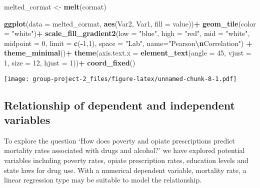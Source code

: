 \documentclass[
]{article}
\newenvironment{Shaded}{\begin{snugshade}}{\end{snugshade}}
\newcommand{\AttributeTok}[1]{\textcolor[rgb]{0.13,0.29,0.53}{#1}}
\newcommand{\DecValTok}[1]{\textcolor[rgb]{0.00,0.00,0.81}{#1}}
\newcommand{\FunctionTok}[1]{\textcolor[rgb]{0.13,0.29,0.53}{\textbf{#1}}}
\newcommand{\NormalTok}[1]{#1}
\newcommand{\OtherTok}[1]{\textcolor[rgb]{0.56,0.35,0.01}{#1}}
\newcommand{\SpecialCharTok}[1]{\textcolor[rgb]{0.81,0.36,0.00}{\textbf{#1}}}
\newcommand{\StringTok}[1]{\textcolor[rgb]{0.31,0.60,0.02}{#1}}
\begin{document}
\begin{Shaded}
\begin{Highlighting}[]
\NormalTok{melted\_cormat }\OtherTok{\textless{}{-}} \FunctionTok{melt}\NormalTok{(cormat)}

\FunctionTok{ggplot}\NormalTok{(}\AttributeTok{data =}\NormalTok{ melted\_cormat, }\FunctionTok{aes}\NormalTok{(Var2, Var1, }\AttributeTok{fill =}\NormalTok{ value))}\SpecialCharTok{+}
 \FunctionTok{geom\_tile}\NormalTok{(}\AttributeTok{color =} \StringTok{"white"}\NormalTok{)}\SpecialCharTok{+}
 \FunctionTok{scale\_fill\_gradient2}\NormalTok{(}\AttributeTok{low =} \StringTok{"blue"}\NormalTok{, }\AttributeTok{high =} \StringTok{"red"}\NormalTok{, }\AttributeTok{mid =} \StringTok{"white"}\NormalTok{, }
   \AttributeTok{midpoint =} \DecValTok{0}\NormalTok{, }\AttributeTok{limit =} \FunctionTok{c}\NormalTok{(}\SpecialCharTok{{-}}\DecValTok{1}\NormalTok{,}\DecValTok{1}\NormalTok{), }\AttributeTok{space =} \StringTok{"Lab"}\NormalTok{, }
   \AttributeTok{name=}\StringTok{"Pearson}\SpecialCharTok{\textbackslash{}n}\StringTok{Correlation"}\NormalTok{) }\SpecialCharTok{+}
  \FunctionTok{theme\_minimal}\NormalTok{()}\SpecialCharTok{+} 
 \FunctionTok{theme}\NormalTok{(}\AttributeTok{axis.text.x =} \FunctionTok{element\_text}\NormalTok{(}\AttributeTok{angle =} \DecValTok{45}\NormalTok{, }\AttributeTok{vjust =} \DecValTok{1}\NormalTok{, }
    \AttributeTok{size =} \DecValTok{12}\NormalTok{, }\AttributeTok{hjust =} \DecValTok{1}\NormalTok{))}\SpecialCharTok{+}
 \FunctionTok{coord\_fixed}\NormalTok{()}
\end{Highlighting}
\end{Shaded}

\texttt{[image: group-project-2\_files/figure-latex/unnamed-chunk-8-1.pdf]}

\hypertarget{relationship-of-dependent-and-independent-variables}{%
\subsection{Relationship of dependent and independent
variables}\label{relationship-of-dependent-and-independent-variables}}

To explore the question `How does poverty and opiate prescriptions
predict mortality rates associated with drugs and alcohol?' we have
explored potential variables including poverty rates, opiate
prescription rates, education levels and state laws for drug use. With a
numerical dependent variable, mortality rate, a linear regression type
may be suitable to model the relationship.
\end{document}
